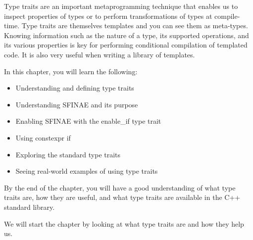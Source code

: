 Type traits are an important metaprogramming technique that enables us to inspect properties of types or to perform transformations of types at compile-time. Type traits are themselves templates and you can see them as meta-types. Knowing information such as the nature of a type, its supported operations, and its various properties is key for performing conditional compilation of templated code. It is also very useful when writing a library of templates.

In this chapter, you will learn the following:

\begin{itemize}
\item
Understanding and defining type traits

\item
Understanding SFINAE and its purpose

\item
Enabling SFINAE with the enable\_if type trait

\item
Using constexpr if

\item
Exploring the standard type traits

\item
Seeing real-world examples of using type traits
\end{itemize}

By the end of the chapter, you will have a good understanding of what type traits are, how they are useful, and what type traits are available in the C++ standard library.

We will start the chapter by looking at what type traits are and how they help us.



























